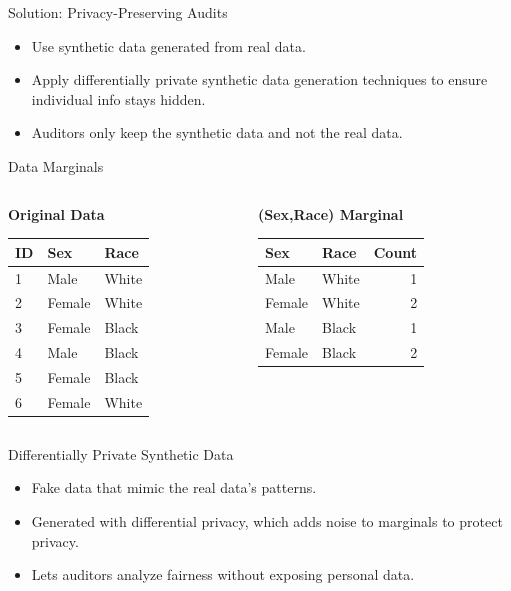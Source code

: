\documentclass{beamer}
\begin{document}
\begin{frame}{Solution: Privacy-Preserving Audits}
  \begin{itemize}
    \item Use synthetic data generated from real data.
    \item Apply differentially private synthetic data generation techniques to ensure individual info stays hidden.
    \item Auditors only keep the synthetic data and not the real data.
  \end{itemize}
\end{frame}

\begin{frame}{Data Marginals}
  \begin{columns}
    \begin{column}{0.48\textwidth}
      \centering
      \textbf{Original Data}
      \begin{tabular}{|l|l|l|}
        \hline
        \textbf{ID} & \textbf{Sex} & \textbf{Race} \\
        \hline
        1 & Male   & White \\
        2 & Female & White \\
        3 & Female & Black \\
        4 & Male   & Black \\
        5 & Female & Black \\
        6 & Female & White \\
        \hline
      \end{tabular}
    \end{column}

    \begin{column}{0.48\textwidth}
      \centering
      \textbf{(Sex,Race) Marginal}
      \begin{tabular}{|l|l|r|}
        \hline
        \textbf{Sex} & \textbf{Race} & \textbf{Count} \\
        \hline
        Male   & White & 1 \\
        Female & White & 2 \\
        Male   & Black & 1 \\
        Female & Black & 2 \\
        \hline
      \end{tabular}
    \end{column}
  \end{columns}
\end{frame}

\begin{frame}{Differentially Private Synthetic Data}
  \begin{itemize}
    \item Fake data that mimic the real data's patterns.
    \item Generated with differential privacy, which adds noise to marginals to protect privacy.
    \item Lets auditors analyze fairness without exposing personal data.
  \end{itemize}
\end{frame}
\end{document}
